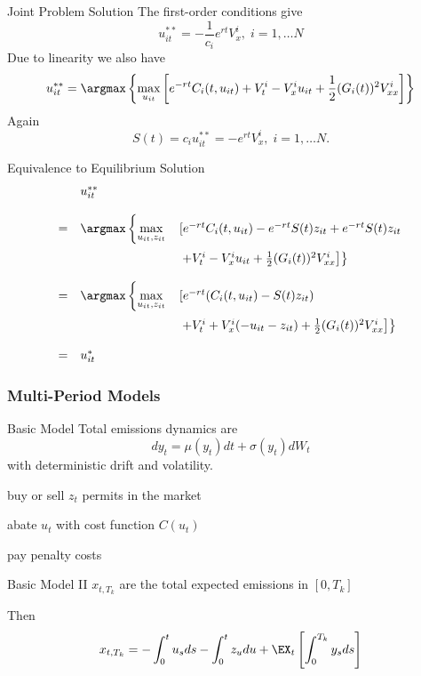 Joint Problem Solution
	The first-order conditions give
		$$
		u_{it}^{**}= -\frac{1}{c_i} e^{rt} V^i_x, \; i=1, \ldots N
		$$
	Due to linearity we also have
		$$
		u_{it}^{**}= \argmax \left\{ \max_{u_{it}} \left[e^{-rt} C_i(t,u_{it}) + V^i_t -V_x^iu_{it} + \frac{1}{2}(G_i(t))^2 V^i_{xx}\right]
		\right\}
		$$
	Again
		$$
		S(t) = c_i u_{it}^{**}= -e^{rt}V^i_x, \; i=1, \ldots N.
		$$


Equivalence to Equilibrium Solution
	$$
	\begin{array}{lll}
	&u_{it}^{**}&\\*[12pt]
	=&  \argmax \left\{ \displaystyle \max_{u_{it},z_{it}} \right. &\left[e^{-rt} C_i(t,u_{it}) -e^{-rt}S(t)z_{it} +e^{-rt}S(t)z_{it} \right.\\*[12pt]
	 &&\left.\left. + V^i_t -V_x^iu_{it} + \frac{1}{2}(G_i(t))^2 V^i_{xx}\right]
	\right\}\\*[12pt]
	=&  \argmax \left\{ \displaystyle \max_{u_{it},z_{it}} \right. &\left[e^{-rt} (C_i(t,u_{it}) -S(t)z_{it}) \right. \\*[12pt]
	&&\left.\left. + V^i_t +V_x^i(-u_{it}-z_{it}) + \frac{1}{2}(G_i(t))^2 V^i_{xx}\right]
	\right\}\\*[12pt]
	=&u_{it}^*&
	\end{array}
	$$


\subsubsection{Multi-Period Models}

Basic Model
	Total emissions dynamics are
		\begin{equation}
		dy_t= \mu(y_t)dt + \sigma(y_t)dW_t
		\end{equation}
	with deterministic drift and volatility.
	
	buy or sell $z_t$  permits in the market
	
	abate $u_t$ with cost function $C(u_t)$
	
	pay penalty costs


Basic Model II
	$x_{t,T_k}$ are the total expected emissions in $[0,T_k]$
	
	Then
		\begin{equation}
		x_{t,T_k}=-\int_0^tu_s ds  -\int_0^t z_u du + \EX_t\left[\int_0^{T_k} y_s ds \right]
		\end{equation}


